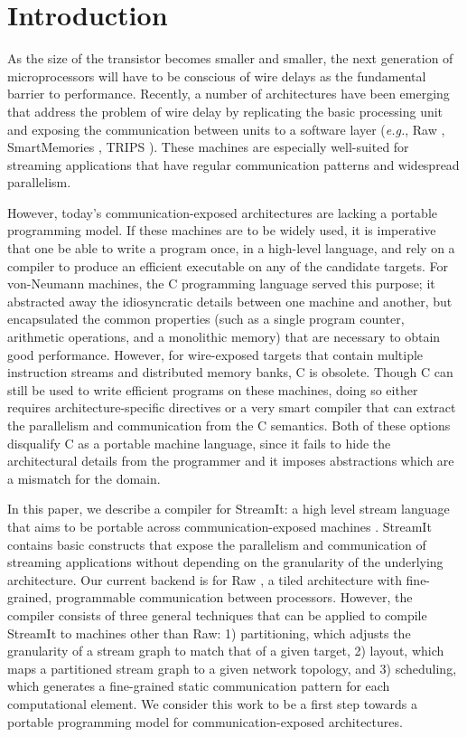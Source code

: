\section{Introduction}

As the size of the transistor becomes smaller and smaller, the next
generation of microprocessors will have to be conscious of wire delays
as the fundamental barrier to performance.  Recently, a number of
architectures have been emerging that address the problem of wire
delay by replicating the basic processing unit and exposing the
communication between units to a software layer ({\it e.g.}, Raw
\cite{rawshort}, SmartMemories \cite{smartmemories}, TRIPS
\cite{trips}).  These machines are especially well-suited for
streaming applications that have regular communication patterns and
widespread parallelism.

However, today's communication-exposed architectures are lacking a
portable programming model.  If these machines are to be widely used,
it is imperative that one be able to write a program once, in a
high-level language, and rely on a compiler to produce an efficient
executable on any of the candidate targets. For von-Neumann machines,
the C programming language served this purpose; it abstracted away the
idiosyncratic details between one machine and another, but
encapsulated the common properties (such as a single program counter,
arithmetic operations, and a monolithic memory) that are necessary to
obtain good performance.  However, for wire-exposed targets that
contain multiple instruction streams and distributed memory banks, C
is obsolete.  Though C can still be used to write efficient programs
on these machines, doing so either requires architecture-specific
directives or a very smart compiler that can extract the parallelism
and communication from the C semantics.  Both of these options
disqualify C as a portable machine language, since it fails to hide
the architectural details from the programmer and it imposes
abstractions which are a mismatch for the domain.

In this paper, we describe a compiler for StreamIt: a high level
stream language that aims to be portable across communication-exposed
machines \cite{streamitcc}.  StreamIt contains basic constructs that
expose the parallelism and communication of streaming applications
without depending on the granularity of the underlying architecture.
Our current backend is for Raw \cite{rawshort}, a tiled architecture
with fine-grained, programmable communication between processors.
However, the compiler consists of three general techniques that can be
applied to compile StreamIt to machines other than Raw: 1)
partitioning, which adjusts the granularity of a stream graph to match
that of a given target, 2) layout, which maps a partitioned stream
graph to a given network topology, and 3) scheduling, which generates
a fine-grained static communication pattern for each computational
element.  We consider this work to be a first step towards a portable
programming model for communication-exposed architectures.

